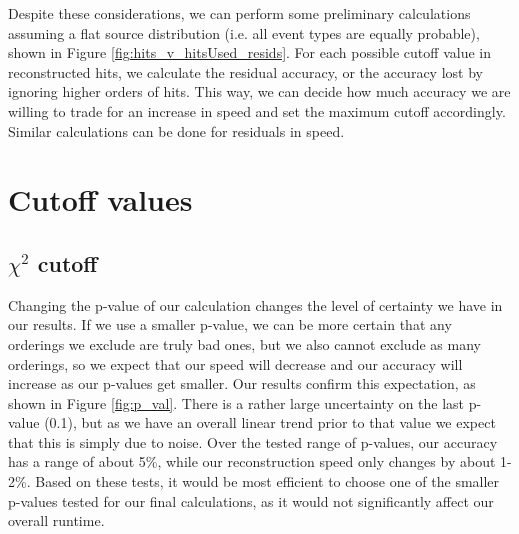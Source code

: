 Despite these considerations, we can perform some preliminary calculations assuming a flat source distribution (i.e. all event types are equally probable), shown in Figure \ref{fig:hits_v_hitsUsed_resids}. For each possible cutoff value in reconstructed hits, we calculate the residual accuracy, or the accuracy lost by ignoring higher orders of hits. This way, we can decide how much accuracy we are willing to trade for an increase in speed and set the maximum cutoff accordingly. Similar calculations can be done for residuals in speed.

\section{Cutoff values}
\subsection*{$\chi^2$ cutoff}
Changing the p-value of our calculation changes the level of certainty we have in our results. If we use a smaller p-value, we can be more certain that any orderings we exclude are truly bad ones, but we also cannot exclude as many orderings, so we expect that our speed will decrease and our accuracy will increase as our p-values get smaller. Our results confirm this expectation, as shown in Figure \ref{fig:p_val}. There is a rather large uncertainty on the last p-value (0.1), but as we have an overall linear trend prior to that value we expect that this is simply due to noise. Over the tested range of p-values, our accuracy has a range of about 5\%, while our reconstruction speed only changes by about 1-2\%. Based on these tests, it would be most efficient to choose one of the smaller p-values tested for our final calculations, as it would not significantly affect our overall runtime.

